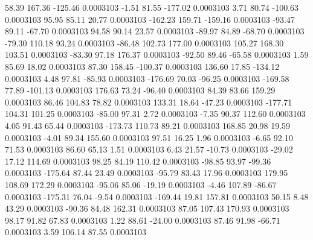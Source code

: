        58.39      167.36     -125.46     0.0003103
       -1.51       81.55     -177.02     0.0003103
        3.71       80.74     -100.63     0.0003103
       95.95       85.11       20.77     0.0003103
     -162.23      159.71     -159.16     0.0003103
      -93.47       89.11      -67.70     0.0003103
       94.58       90.14       23.57     0.0003103
      -89.97       84.89      -68.70     0.0003103
      -79.30      110.18       93.24     0.0003103
      -86.48      102.73      177.00     0.0003103
      105.27      168.30      103.51     0.0003103
      -83.30       97.18      176.37     0.0003103
      -92.50       89.46      -65.58     0.0003103
        1.59       85.69       18.02     0.0003103
       87.30      158.45     -100.37     0.0003103
      136.60       17.85     -134.12     0.0003103
        4.48       97.81      -85.93     0.0003103
     -176.69       70.03      -96.25     0.0003103
     -169.58       77.89     -101.13     0.0003103
      176.63       73.24      -96.40     0.0003103
       84.39       83.66      159.29     0.0003103
       86.46      104.83       78.82     0.0003103
      133.31       18.64      -47.23     0.0003103
     -177.71      104.31      101.25     0.0003103
      -85.00       97.31        2.72     0.0003103
       -7.35       90.37      112.60     0.0003103
        4.05       91.43       65.44     0.0003103
     -173.73      110.73       89.21     0.0003103
      168.85       20.98       19.59     0.0003103
       -4.01       89.34      155.60     0.0003103
       97.51       16.25        1.96     0.0003103
       -6.65       92.10       71.53     0.0003103
       86.60       65.13        1.51     0.0003103
        6.43       21.57      -10.73     0.0003103
      -29.02       17.12      114.69     0.0003103
       98.25       84.19      110.42     0.0003103
      -98.85       93.97      -99.36     0.0003103
     -175.64       87.44       23.49     0.0003103
      -95.79       83.43       17.96     0.0003103
      179.95      108.69      172.29     0.0003103
      -95.06       85.06      -19.19     0.0003103
       -4.46      107.89      -86.67     0.0003103
     -175.31       76.04       -9.54     0.0003103
     -169.44       19.81      157.81     0.0003103
       50.15        8.48       43.29     0.0003103
      -90.36       84.48      162.31     0.0003103
       87.05      107.43      170.93     0.0003103
       98.17       91.82       67.83     0.0003103
        1.22       88.61      -24.00     0.0003103
       87.46       91.98      -66.71     0.0003103
        3.59      106.14       87.55     0.0003103
